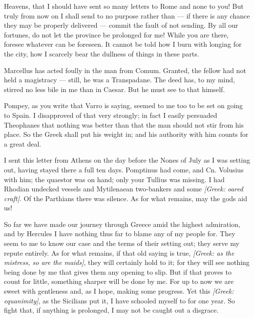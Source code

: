 

 Heavens, that I should have sent so many letters to Rome and none to you! But truly from now on I shall send to no purpose rather than --- if there is any chance they may be properly delivered --- commit the fault of not sending. By all our fortunes, do not let the province be prolonged for me! While you are there, foresee whatever can be foreseen. It cannot be told how I burn with longing for the city, how I scarcely bear the dullness of things in these parts.

 Marcellus has acted foully in the man from Comum. Granted, the fellow had not held a magistracy --- still, he was a Transpadane. The deed has, to my mind, stirred no less bile in me than in Caesar. But he must see to that himself.

 Pompey, as you write that Varro is saying, seemed to me too to be set on going to Spain. I disapproved of that very strongly; in fact I easily persuaded Theophanes that nothing was better than that the man should not stir from his place. So the Greek shall put his weight in; and his authority with him counts for a great deal.

 I sent this letter from Athens on the day before the Nones of July as I was setting out, having stayed there a full ten days. Pomptinus had come, and Cn. Volusius with him; the quaestor was on hand; only your Tullius was missing. I had Rhodian undecked vessels and Mytilenaean two-bankers and some \textit{[Greek: oared craft]}. Of the Parthians there was silence. As for what remains, may the gods aid us!

 So far we have made our journey through Greece amid the highest admiration, and by Hercules I have nothing thus far to blame any of my people for. They seem to me to know our case and the terms of their setting out; they serve my repute entirely. As for what remains, if that old saying is true, \textit{[Greek: as the mistress, so are the maids]}, they will certainly hold to it; for they will see nothing being done by me that gives them any opening to slip. But if that proves to count for little, something sharper will be done by me. For up to now we are sweet with gentleness and, as I hope, making some progress. Yet this \textit{[Greek: equanimity]}, as the Sicilians put it, I have schooled myself to for one year. So fight that, if anything is prolonged, I may not be caught out a disgrace.

